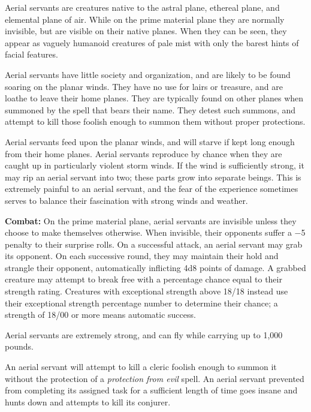 \begin{multicols}{2}
\begin{minipage}{\columnwidth}
\end{minipage}

Aerial servants are creatures native to the astral plane, ethereal plane, and elemental plane of air. While on the prime material plane they are normally invisible, but are visible on their native planes. When they can be seen, they appear as vaguely humanoid creatures of pale mist with only the barest hints of facial features. 

Aerial servants have little society and organization, and are likely to be found soaring on the planar winds. They have no use for lairs or treasure, and are loathe to leave their home planes. They are typically found on other planes when summoned by the spell that bears their name. They detest such summons, and attempt to kill those foolish enough to summon them without proper protections. 

Aerial servants feed upon the planar winds, and will starve if kept long enough from their home planes. Aerial servants reproduce by chance when they are caught up in particularly violent storm winds. If the wind is sufficiently strong, it may rip an aerial servant into two; these parts grow into separate beings. This is extremely painful to an aerial servant, and the fear of the experience sometimes serves to balance their fascination with strong winds and weather.

\textbf{Combat:}  On the prime material plane, aerial servants are invisible unless they choose to make themselves otherwise. When invisible, their opponents suffer a $-$5 penalty to their surprise rolls. On a successful attack, an aerial servant may grab its opponent. On each successive round, they may maintain their hold and strangle their opponent, automatically inflicting 4d8 points of damage.  A grabbed creature may attempt to break free with a percentage chance equal to their strength rating.  Creatures with exceptional strength above 18/18 instead use their exceptional strength percentage number to determine their chance; a strength of 18/00 or more means automatic success.

Aerial servants are extremely strong, and can fly while carrying up to 1,000 pounds.

An aerial servant will attempt to kill a cleric foolish enough to summon it without the protection of  a \textit{protection from evil} spell.  An aerial servant prevented from completing its assigned task for a sufficient length of time goes insane and hunts down and attempts to kill its conjurer.


\end{multicols}

